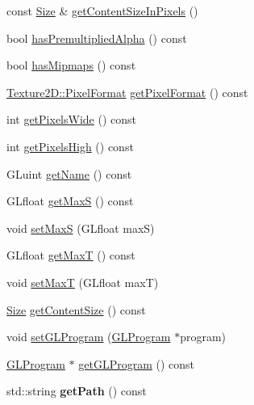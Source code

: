 \begin{DoxyCompactItemize}
\item 
const \hyperlink{classSize}{Size} \& \hyperlink{classTexture2D_ac158f36e8cd5a584e8a76f67abad563d}{get\+Content\+Size\+In\+Pixels} ()
\item 
bool \hyperlink{classTexture2D_aa1cc09ea8b7015cc2bf66a7847ee0990}{has\+Premultiplied\+Alpha} () const
\item 
bool \hyperlink{classTexture2D_a5a19e34a8e9f9192f81193f7bf8cdbc2}{has\+Mipmaps} () const
\item 
\hyperlink{classTexture2D_a45d9d8bb5a0669def36bbdfbfb91d220}{Texture2\+D\+::\+Pixel\+Format} \hyperlink{classTexture2D_a50abeeaa43511e402499c0e3c3c1ef22}{get\+Pixel\+Format} () const
\item 
int \hyperlink{classTexture2D_a87918e080c6edb84236e2438c055307b}{get\+Pixels\+Wide} () const
\item 
int \hyperlink{classTexture2D_a380681da07007b979df13ff7855312e5}{get\+Pixels\+High} () const
\item 
G\+Luint \hyperlink{classTexture2D_a2190dbf64d30302d1a3626a799a3504c}{get\+Name} () const
\item 
G\+Lfloat \hyperlink{classTexture2D_ac5d32187817ecac6e541ab5d41900b16}{get\+MaxS} () const
\item 
void \hyperlink{classTexture2D_afff3f3a59a2fec96d6a343a7e4c2ea97}{set\+MaxS} (G\+Lfloat maxS)
\item 
G\+Lfloat \hyperlink{classTexture2D_a1aca482857641c5f4d59afb90dd7ec9e}{get\+MaxT} () const
\item 
void \hyperlink{classTexture2D_add1529d1406a3a408bfaa68bd5af8693}{set\+MaxT} (G\+Lfloat maxT)
\item 
\hyperlink{classSize}{Size} \hyperlink{classTexture2D_a3ca89213245342676defce5f4124e36b}{get\+Content\+Size} () const
\item 
void \hyperlink{classTexture2D_ab1e3f2bdc255d893dfc6ad541ceb29c0}{set\+G\+L\+Program} (\hyperlink{classGLProgram}{G\+L\+Program} $\ast$program)
\item 
\hyperlink{classGLProgram}{G\+L\+Program} $\ast$ \hyperlink{classTexture2D_ae61deb7557336bc34a563d12e7a1c315}{get\+G\+L\+Program} () const
\item 
\mbox{\label{classTexture2D_a0fece49baa70c5257db2e9ddf88b8fcd}} 
std\+::string {\bfseries get\+Path} () const
\item 
\mbox{\label{classTexture2D_a40d47bff7f05c1ef11a7a6a40ad0578c}} 

\end{DoxyCompactItemize}
